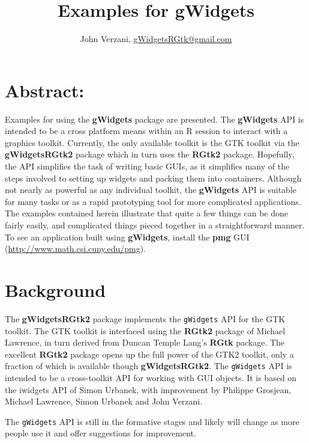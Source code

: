 \documentclass[12pt]{article}
\newcommand{\RCode}[1]{\texttt{#1}}
\newcommand{\RPackage}[1]{\textbf{#1}}
\begin{document}
\thispagestyle{plain}
\title{Examples for gWidgets}

\author{John Verzani, \url{gWidgetsRGtk@gmail.com}}
\maketitle

\section*{Abstract:}
Examples for using the \RPackage{gWidgets} package are presented.  The
\RPackage{gWidgets} API is intended to be a cross platform means
within an R session to interact with a graphics toolkit.  Currently,
the only available toolkit is the GTK toolkit via the
\RPackage{gWidgetsRGtk2} package which in turn uses the
\RPackage{RGtk2} package.  Hopefully, the API simplifies the task of
writing basic GUIs, as it simplifies many of the steps involved to
setting up widgets and packing them into containers. Although not
nearly as powerful as any individual toolkit, the \RPackage{gWidgets}
API is suitable for many tasks or as a rapid prototyping tool for more
complicated applications. The examples contained herein illustrate
that quite a few things can be done fairly easily, and complicated
things pieced together in a straightforward manner.  To see an
application built using \RPackage{gWidgets}, install the
\RPackage{pmg} GUI (\url{http://www.math.csi.cuny.edu/pmg}).


\setcounter{tocdepth}{3}
\tableofcontents

\section{Background}
The \RPackage{gWidgetsRGtk2} package implements the \RCode{gWidgets} API for the
GTK toolkit. The GTK toolkit is interfaced using the \RPackage{RGtk2}
package of Michael Lawrence, in turn derived from Duncan Temple Lang's
\RPackage{RGtk} package. The excellent \RPackage{RGtk2} package opens up
the full power of the GTK2 toolkit, only a fraction of which is
available though \RPackage{gWidgetsRGtk2}.  The \RCode{gWidgets} API is intended
to be a cross-toolkit API for working with GUI objects. It is based on
the iwidgets API of Simon Urbanek, with improvement by Philippe
Grosjean, Michael Lawrence, Simon Urbanek and John Verzani.

The \RCode{gWidgets} API is still in the formative stages and likely will
change as more people use it and offer suggestions for improvement.
\end{document}
